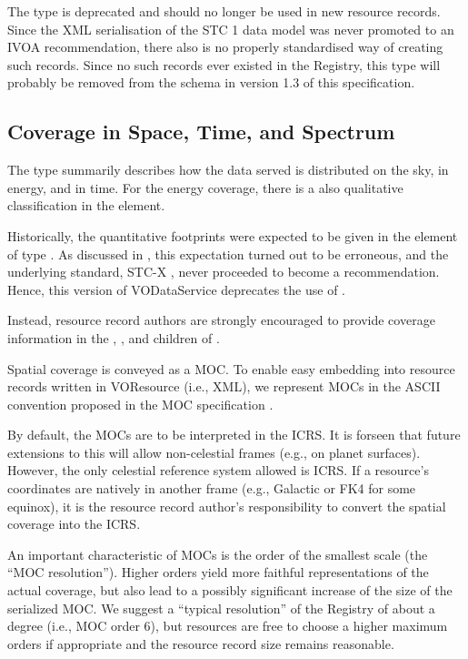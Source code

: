 \documentclass[11pt,a4paper]{ivoa}
\begin{document}
The  type is deprecated and should no longer be
used in new resource records.  Since the XML serialisation of the STC 1
data model was never promoted to an IVOA recommendation, there also is
no properly standardised way of creating such records.  Since no such
records ever existed in the Registry, this type will probably be removed
from the schema in version 1.3 of this specification.



\subsection{Coverage in Space, Time, and Spectrum}
\label{sect:cover}

The  type summarily describes how the data served is
distributed on the
sky, in energy, and in time.  For the energy coverage, there is a
also qualitative classification in the   element.

Historically, the quantitative footprints were expected to be given in
the element of type .  As discussed in
\citet{note:regstc}, this expectation turned out to be erroneous,
and the underlying standard, STC-X \citep{note:stcx}, never proceeded to become
a recommendation.  Hence, this version of VODataService deprecates the
use of .

Instead, resource record authors are strongly encouraged to provide
coverage information in the , , and
 children of .

Spatial coverage is conveyed as a MOC.  To enable easy embedding into
resource records written in VOResource (i.e., XML), 
we represent MOCs in the ASCII convention
proposed in the MOC specification \citep{2014ivoa.spec.0602F}.

By default, the MOCs are to be interpreted in the ICRS.  It is forseen
that future extensions  to this will allow non-celestial frames (e.g., on planet
surfaces).  However, the only celestial reference system allowed is
ICRS.  If a resource's coordinates are natively in another frame (e.g.,
Galactic or FK4 for some equinox), it is the resource record author's
responsibility to convert the spatial coverage into the ICRS.

An important characteristic of MOCs is the order of the smallest scale
(the ``MOC resolution'').  Higher orders yield more faithful
representations of the actual coverage, but also lead to a possibly
significant increase of the size of the serialized MOC.  We suggest a
``typical resolution'' of the Registry of about a degree (i.e., MOC
order 6), but resources are free to choose a higher maximum orders if
appropriate and the resource record size remains reasonable.
\end{document}
